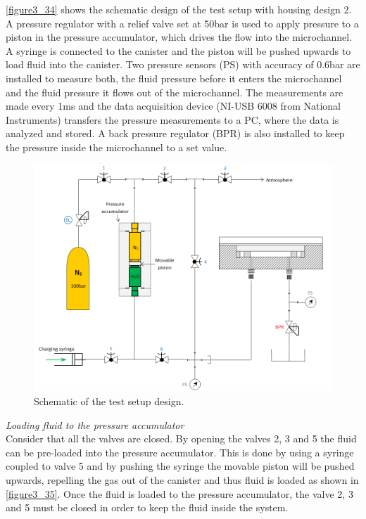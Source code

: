 \autoref{figure3_34} shows the schematic design of the test setup with housing design 2. A pressure regulator with a relief valve set at 50bar is used to apply pressure to a piston in the pressure accumulator, which drives the flow into the microchannel. A syringe is connected to the canister and the piston will be pushed upwards to load fluid into the canister. Two pressure sensors (PS) with accuracy of 0.6bar are installed to measure both, the fluid pressure before it enters the microchannel and the fluid pressure it flows out of the microchannel. The measurements are made every 1ms and the data acquisition device (NI-USB 6008 from National Instruments) transfers the pressure measurements to a PC, where the data is analyzed and stored. A back pressure regulator (BPR) is also installed to keep the pressure inside the microchannel to a set value.\\
\clearpage
\begin{figure}[ht]%
\centering
\includegraphics[width=1\textwidth]{figures/designandfabrication/figure3_34}%
\caption{Schematic of the test setup design.}%
\label{figure3_34}%
\end{figure}



\noindent \textit{Loading fluid to the pressure accumulator}\\

Consider that all the valves are closed. By opening the valves 2, 3 and 5 the fluid can be pre-loaded into the pressure accumulator. This is done by using a syringe coupled to valve 5 and by pushing the syringe the movable piston will be pushed upwards, repelling the gas out of the canister and thus fluid is loaded as shown in \autoref{figure3_35}. Once the fluid is loaded to the pressure accumulator, the valve 2, 3 and 5 must be closed in order to keep the fluid inside the system.\\
\clearpage

